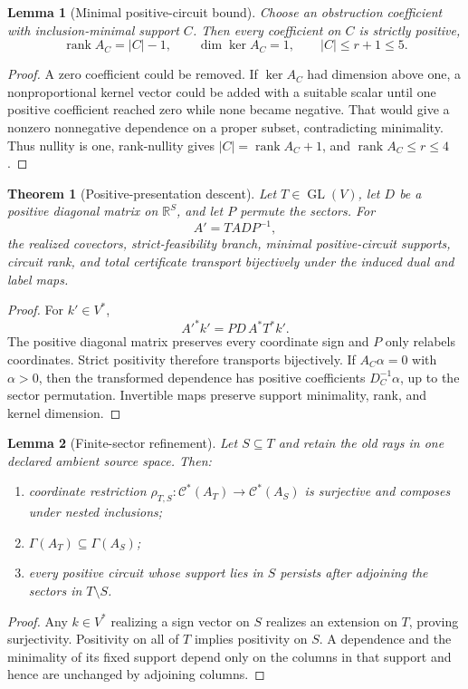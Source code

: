 \documentclass[11pt]{article}
\newtheorem{theorem}{Theorem}
\newtheorem{lemma}{Lemma}
\newcommand{\R}{\mathbb{R}}
\newcommand{\rank}{\operatorname{rank}}
\newcommand{\Cstar}{\mathcal{C}^{*}}
\newcommand{\GammaA}{\Gamma}
\begin{document}
\begin{lemma}[Minimal positive-circuit bound]
Choose an obstruction coefficient with inclusion-minimal support \(C\).
Then every coefficient on \(C\) is strictly positive,
\[
  \rank A_C=|C|-1,\qquad
  \dim\ker A_C=1,\qquad
  |C|\le r+1\le5.
\]
\end{lemma}
\begin{proof}
A zero coefficient could be removed.  If \(\ker A_C\) had dimension above one,
a nonproportional kernel vector could be added with a suitable scalar until
one positive coefficient reached zero while none became negative.  That would
give a nonzero nonnegative dependence on a proper subset, contradicting
minimality.  Thus nullity is one, rank-nullity gives
\(|C|=\rank A_C+1\), and \(\rank A_C\le r\le4\).
\end{proof}

\begin{theorem}[Positive-presentation descent]
Let \(T\in\operatorname{GL}(V)\), let \(D\) be a positive diagonal matrix on
\(\R^S\), and let \(P\) permute the sectors.  For
\[
  A'=TADP^{-1},
\]
the realized covectors, strict-feasibility branch, minimal positive-circuit
supports, circuit rank, and total certificate transport bijectively under the
induced dual and label maps.
\end{theorem}
\begin{proof}
For \(k'\in V^*\),
\[
  A'^*k'=PD\,A^*T^*k'.
\]
The positive diagonal matrix preserves every coordinate sign and \(P\) only
relabels coordinates.  Strict positivity therefore transports bijectively.
If \(A_C\alpha=0\) with \(\alpha>0\), then the transformed dependence has
positive coefficients \(D_C^{-1}\alpha\), up to the sector permutation.
Invertible maps preserve support minimality, rank, and kernel dimension.
\end{proof}

\begin{lemma}[Finite-sector refinement]
Let \(S\subseteq T\) and retain the old rays in one declared ambient source
space.  Then:
\begin{enumerate}
  \item coordinate restriction
        \(\rho_{T,S}:\Cstar(A_T)\to\Cstar(A_S)\) is surjective and composes
        under nested inclusions;
  \item \(\GammaA(A_T)\subseteq\GammaA(A_S)\);
  \item every positive circuit whose support lies in \(S\) persists after
        adjoining the sectors in \(T\setminus S\).
\end{enumerate}
\end{lemma}
\begin{proof}
Any \(k\in V^*\) realizing a sign vector on \(S\) realizes an extension on
\(T\), proving surjectivity.  Positivity on all of \(T\) implies positivity on
\(S\).  A dependence and the minimality of its fixed support depend only on
the columns in that support and hence are unchanged by adjoining columns.
\end{proof}
\end{document}
